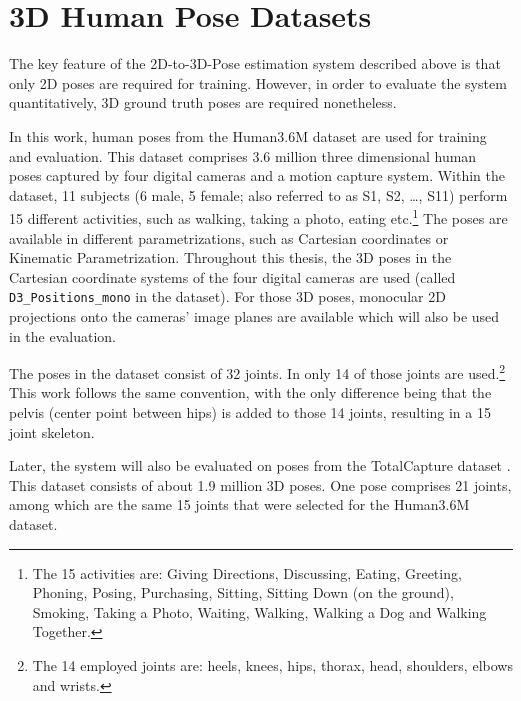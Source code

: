 \section{3D Human Pose Datasets}
\label{sec:data}

The key feature of the 2D-to-3D-Pose estimation system described above is that only 2D poses are required for training.
However, in order to evaluate the system quantitatively, 3D ground truth poses are required nonetheless.

In this work, human poses from the Human3.6M dataset \cite{ionescu14} are used for training and evaluation.
This dataset comprises 3.6 million three dimensional human poses captured by four digital cameras and a motion capture system.
Within the dataset, 11 subjects (6 male, 5 female; also referred to as S1, S2, \dots, S11) perform 15 different activities, such as walking, taking a photo, eating etc.\footnote{
	The 15 activities are: Giving Directions, Discussing, Eating, Greeting, Phoning, Posing, Purchasing, Sitting, Sitting Down (on the ground), Smoking, Taking a Photo, Waiting, Walking, Walking a Dog and Walking Together.
}
The poses are available in different parametrizations, such as Cartesian coordinates or Kinematic Parametrization.
Throughout this thesis, the 3D poses in the Cartesian coordinate systems of the four digital cameras are used (called \texttt{D3\_Positions\_mono} in the dataset).
For those 3D poses, monocular 2D projections onto the cameras' image planes are available which will also be used in the evaluation.

The poses in the dataset consist of 32 joints.
In \cite{drover18} only 14 of those joints are used.\footnote{
The 14 employed joints are: heels, knees, hips, thorax, head, shoulders, elbows and wrists.
}
This work follows the same convention, with the only difference being that the pelvis (center point between hips) is added to those 14 joints, resulting in a 15 joint skeleton.

Later, the system will also be evaluated on poses from the TotalCapture dataset \cite{trumble17}.
This dataset consists of about 1.9 million 3D poses.
One pose comprises 21 joints, among which are the same 15 joints that were selected for the Human3.6M dataset.

